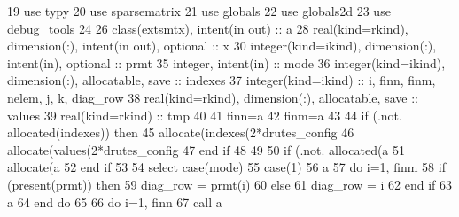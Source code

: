 \begin{DoxyCode}
19       \textcolor{keywordtype}{use }typy
20       \textcolor{keywordtype}{use }sparsematrix
21       \textcolor{keywordtype}{use }globals
22       \textcolor{keywordtype}{use }globals2d
23       \textcolor{keywordtype}{use }debug_tools
24 
26       \textcolor{keywordtype}{class}(extsmtx), \textcolor{keywordtype}{intent(in out)} :: a
28       \textcolor{keywordtype}{real(kind=rkind)}, \textcolor{keywordtype}{dimension(:)}, \textcolor{keywordtype}{intent(in out)}, \textcolor{keywordtype}{optional} :: x
30       \textcolor{keywordtype}{integer(kind=ikind)}, \textcolor{keywordtype}{dimension(:)}, \textcolor{keywordtype}{intent(in)}, \textcolor{keywordtype}{optional} :: prmt
35       \textcolor{keywordtype}{integer}, \textcolor{keywordtype}{intent(in)} :: mode
36       \textcolor{keywordtype}{integer(kind=ikind)}, \textcolor{keywordtype}{dimension(:)}, \textcolor{keywordtype}{allocatable}, \textcolor{keywordtype}{save} :: indexes
37       \textcolor{keywordtype}{integer(kind=ikind)} :: i, finn, finm, nelem, j, k, diag\_row
38       \textcolor{keywordtype}{real(kind=rkind)}, \textcolor{keywordtype}{dimension(:)}, \textcolor{keywordtype}{allocatable}, \textcolor{keywordtype}{save} :: values
39       \textcolor{keywordtype}{real(kind=rkind)} :: tmp
40       
41       finn=a%
42       finm=a%
43 
44       \textcolor{keywordflow}{if} (.not. \textcolor{keyword}{allocated}(indexes)) \textcolor{keywordflow}{then}
45         \textcolor{keyword}{allocate}(indexes(2*drutes_config%
46         \textcolor{keyword}{allocate}(values(2*drutes_config%
47 \textcolor{keywordflow}{      end if}
48 
49 
50       \textcolor{keywordflow}{if} (.not. \textcolor{keyword}{allocated}(a%
51         \textcolor{keyword}{allocate}(a%
52 \textcolor{keywordflow}{      end if}
53       
54       \textcolor{keywordflow}{select case}(mode)
55         \textcolor{keywordflow}{case}(1)
56             a%
57             \textcolor{keywordflow}{do} i=1, finm
58               \textcolor{keywordflow}{if} (\textcolor{keyword}{present}(prmt)) \textcolor{keywordflow}{then}
59                 diag\_row = prmt(i)
60               \textcolor{keywordflow}{else}
61                 diag\_row = i
62 \textcolor{keywordflow}{              end if}
63               a%
64 \textcolor{keywordflow}{            end do}
65 
66             \textcolor{keywordflow}{do} i=1, finn
67               \textcolor{keyword}{call }a%

\end{DoxyCode}
